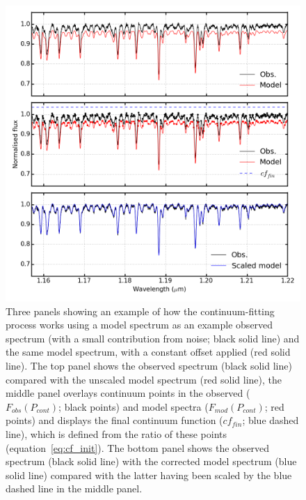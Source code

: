 \begin{figure}
 \centering
\includegraphics[width=\textwidth]{JAnal/cw-3panels}
\caption[Three panels demonstrating the continuum-fitting procedure]{
Three panels showing an example of how the continuum-fitting process works using a model spectrum as an example observed spectrum (with a small contribution from noise; black solid line) and the same model spectrum, with a constant offset applied (red solid line).
The top panel shows the observed spectrum (black solid line) compared with the unscaled model spectrum (red solid line),
the middle panel overlays continuum points in the observed ($F_{obs}(P_{cont})$; black points) and model spectra ($F_{mod}(P_{cont})$; red points) and displays the final continuum function ($cf_{fin}$; blue dashed line), which is defined from the ratio of these points (equation~\ref{eq:cf_init}).
The bottom panel shows the observed spectrum (black solid line) with the corrected model spectrum (blue solid line) compared with the latter having been scaled by the blue dashed line in the middle panel.
\label{fig:cft3pan}}
\end{figure}

